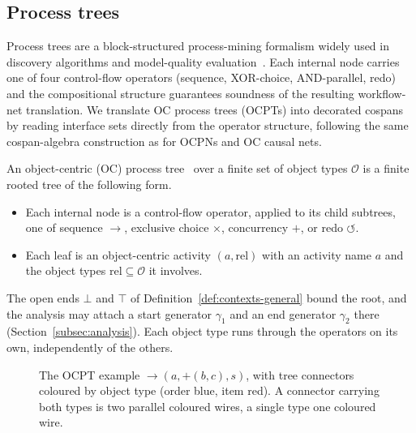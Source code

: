 
\subsection{Process trees}\label{sec:process_trees}

Process trees are a block-structured process-mining formalism widely used in discovery algorithms and model-quality evaluation~\cite{leemansDiscoveringBlockStructuredProcess2013,buijsQualityDimensionsProcess2014}. Each internal node carries one of four control-flow operators (sequence, XOR-choice, AND-parallel, redo) and the compositional structure guarantees soundness of the resulting workflow-net translation. We translate OC process trees (OCPTs) into decorated cospans by reading interface sets directly from the operator structure, following the same cospan-algebra construction as for OCPNs and OC causal nets.

\begin{definition}
  \label{def:process-tree}
  An object-centric (OC) process tree~\cite{leemansDiscoveringBlockStructuredProcess2013,vandettenDiscoveringCompactLive2024}
  over a finite set of object types $\mathcal{O}$ is a finite rooted tree of the following form.
  \begin{itemize}
    \item Each internal node is a control-flow operator, applied to its child subtrees, one of
      sequence $\to$, exclusive choice $\times$, concurrency $+$, or redo $\circlearrowleft$.
    \item Each leaf is an object-centric activity $(a,\mathrm{rel})$ with an activity name $a$ and
      the object types $\mathrm{rel}\subseteq\mathcal{O}$ it involves.
  \end{itemize}
  The open ends $\bot$ and $\top$ of Definition~\ref{def:contexts-general} bound the root, and the
  analysis may attach a start generator $\gamma_1$ and an end generator $\gamma_2$ there
  (Section~\ref{subsec:analysis}). Each object type runs
  through the operators on its own, independently of the others.
\end{definition}

\begin{figure}[tb]
  \centering
  \unskip
  \caption{The OCPT example $\to(a,+(b,c),s)$, with tree connectors coloured by object type (order
    blue, item red). A connector carrying both types is two parallel coloured wires, a single type
    one coloured wire.}
  \label{fig:re-ocpt}
\end{figure}

